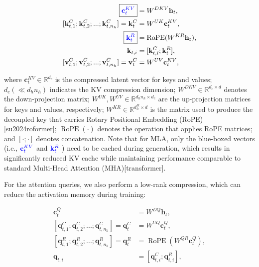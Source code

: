 \documentclass[11pt,a4paper]{article}
\begin{document}
$$\begin{align}
    \boxed{\color{blue} \mathbf{c}_{t}^{KV}} &= W^{DKV} \mathbf{h}_{t}, \\
    [\mathbf{k}_{t, 1}^{C};\mathbf{k}_{t, 2}^{C};...;\mathbf{k}_{t, n_{h}}^{C}] = \mathbf{k}_{t}^{C} &= W^{UK} \mathbf{c}_{t}^{KV}, \\
    \boxed{\color{blue}\mathbf{k}_{t}^{R}} &= \operatorname{RoPE}({W^{KR}} \mathbf{h}_{t}), \\
    \mathbf{k}_{t, i} &= [\mathbf{k}_{t, i}^{C}; \mathbf{k}_{t}^{R}], \\
    [\mathbf{v}_{t, 1}^{C};\mathbf{v}_{t, 2}^{C};...;\mathbf{v}_{t, n_{h}}^{C}] = \mathbf{v}_{t}^{C} &= W^{UV} \mathbf{c}_{t}^{KV}, 
\end{align}$$

where  $\mathbf{c}_{t}^{KV} \in \mathbb{R}^{d_c}$  is the compressed latent vector for keys and values;  $d_c (\ll d_h n_h)$  indicates the KV compression dimension;  $W^{DKV} \in \mathbb{R}^{d_c \times d}$  denotes the down-projection matrix;  $W^{UK},W^{UV} \in \mathbb{R}^{d_h n_h \times d_c}$  are the up-projection matrices for keys and values, respectively;  $W^{KR} \in \mathbb{R}^{d_h^R \times d}$  is the matrix used to produce the decoupled key that carries Rotary Positional Embedding (RoPE)[su2024roformer];  $\operatorname{RoPE}(\cdot)$  denotes the operation that applies RoPE matrices; and  $[\cdot;\cdot]$  denotes concatenation. Note that for MLA, only the blue-boxed vectors (i.e.,  $\color{blue} \mathbf{c}_{t}^{KV}$  and  $\color{blue}\mathbf{k}_{t}^{R}$ ) need to be cached during generation, which results in significantly reduced KV cache while maintaining performance comparable to standard Multi-Head Attention (MHA)[transformer].

For the attention queries, we also perform a low-rank compression, which can reduce the activation memory during training:

$$\begin{align}
    \mathbf{c}_{t}^{Q} &= W^{DQ} \mathbf{h}_{t}, \\
    [\mathbf{q}_{t, 1}^{C};\mathbf{q}_{t, 2}^{C};...;\mathbf{q}_{t, n_{h}}^{C}] = \mathbf{q}_{t}^{C} &= W^{UQ} \mathbf{c}_{t}^{Q}, \\
    [\mathbf{q}_{t, 1}^{R};\mathbf{q}_{t, 2}^{R};...;\mathbf{q}_{t, n_{h}}^{R}] = \mathbf{q}_{t}^{R} &= \operatorname{RoPE}({W^{QR}} \mathbf{c}_{t}^{Q}), \\
    \mathbf{q}_{t, i} &= [\mathbf{q}_{t, i}^{C}; \mathbf{q}_{t, i}^{R}],
\end{align}$$
\end{document}
